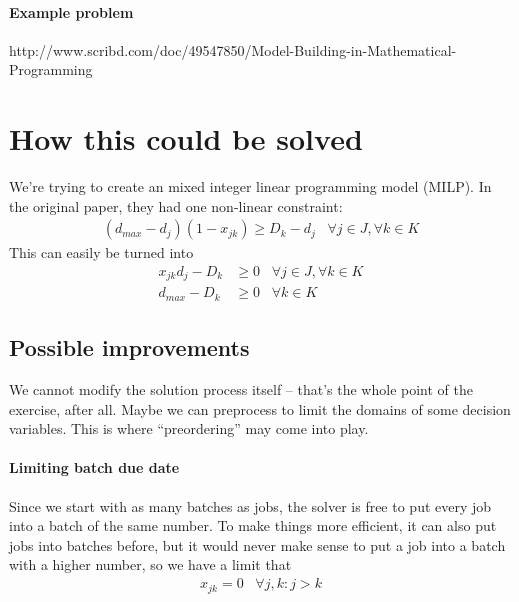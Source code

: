 \documentclass[13pt, letterpaper, twoside]{book}
\begin{document}
\paragraph*{Example problem} 
http://www.scribd.com/doc/49547850/Model-Building-in-Mathematical-Programming

\pagebreak
\section{How this could be solved}
We're trying to create an mixed integer linear programming model (MILP). In the original paper, they had one non-linear constraint:
\begin{align}
  (d_{max}-d_j)(1-x_{jk}) \geq D_k-d_j \;\;\;\forall j \in J, \forall k \in K
\end{align}
This can easily be turned into
\begin{align}
  x_{jk}d_j-D_k &\geq 0\;\;\;\forall j \in J, \forall k \in K\\
  d_{max}-D_k &\geq 0\;\;\;\forall k \in K
\end{align}
\subsection{Possible improvements}
We cannot modify the solution process itself -- that's the whole point of the exercise, after all. Maybe we can preprocess to limit the domains of some decision variables. This is where ``preordering'' may come into play.
\paragraph{Limiting batch due date}
Since we start with as many batches as jobs, the solver is free to put every job into a batch of the same number. To make things more efficient, it can also put jobs into batches before, but it would never make sense to put a job into a batch with a higher number, so we have a limit that
\begin{align}
  x_{jk} = 0 \;\;\; \forall j,k: j > k
\end{align}
\end{document}
